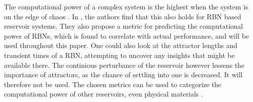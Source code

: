 The computational power of a complex system is the highest when the system is on the edge of chaos \cite{langton3computation}.
In \cite{rbn-reservoir}, the authors find that this also holds for RBN based reservoir systems.
They also propose a metric for predicting the computational power of RBNs,
which is found to correlate with actual performance,
and will be used throughout this paper.
One could also look at the attractor lengths and transient times of a RBN,
attempting to uncover any insights that might be available there.
The continious perturbance of the reservoir however lessens the importance of attractors,
as the chance of settling into one is decreased.
It will therefore not be used.
The chosen metrics can be used to categorize the computational power of other reservoirs,
even physical materials \cite{miller2002evolution}.
